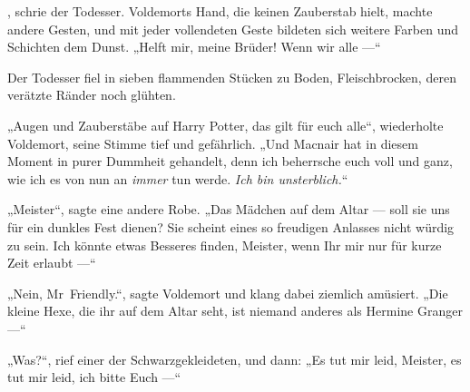 , schrie der Todesser.
Voldemorts Hand, die keinen Zauberstab hielt, machte andere Gesten, und mit jeder vollendeten Geste bildeten sich weitere Farben und Schichten dem Dunst.
„Helft mir, meine Brüder! Wenn wir alle —“

Der Todesser fiel in sieben flammenden Stücken zu Boden, Fleischbrocken, deren verätzte Ränder noch glühten.

„Augen und Zauberstäbe auf Harry Potter, das gilt für euch alle“, wiederholte Voldemort, seine Stimme tief und gefährlich.
„Und Macnair hat in diesem Moment in purer Dummheit gehandelt, denn ich beherrsche euch voll und ganz, wie ich es von nun an \emph{immer} tun werde. \emph{Ich bin unsterblich.}“

„Meister“, sagte eine andere Robe.
„Das Mädchen auf dem Altar — soll sie uns für ein dunkles Fest dienen? Sie scheint eines so freudigen Anlasses nicht würdig zu sein. Ich könnte etwas Besseres finden, Meister, wenn Ihr mir nur für kurze Zeit erlaubt —“

„Nein, Mr~Friendly.“, sagte Voldemort und klang dabei ziemlich amüsiert.
„Die kleine Hexe, die ihr auf dem Altar seht, ist niemand anderes als Hermine Granger —“

„Was?“, rief einer der Schwarzgekleideten, und dann:
„Es tut mir leid, Meister, es tut mir leid, ich bitte Euch —“


